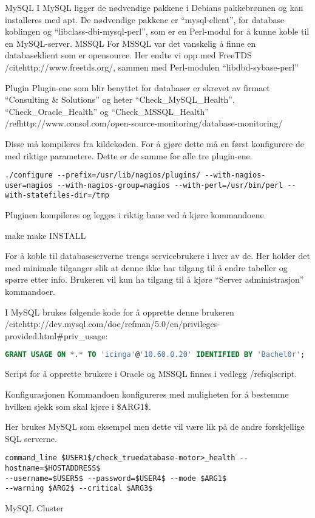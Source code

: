 MySQL
I MySQL ligger de nødvendige pakkene i Debians pakkebrønnen og kan installeres med apt. De nødvendige pakkene er “mysql-client”, for database koblingen og “libclass-dbi-mysql-perl”, som er en Perl-modul for å kunne koble til en MySQL-server. 
MSSQL
For MSSQL var det vanskelig å finne en databaseklient som er opensource. Her endte vi opp med FreeTDS /cite{http://www.freetds.org/}, sammen med Perl-modulen “libdbd-sybase-perl”

Plugin
Plugin-ene som blir benyttet for databaser er skrevet av firmaet “Consulting \& Solutions” og heter “Check\_MySQL\_Health”, “Check\_Oracle\_Health” og “Check\_MSSQL\_Health” /ref{http://www.consol.com/open-source-monitoring/database-monitoring/}

Disse må kompileres fra kildekoden. For å gjøre dette må en først konfigurere de med riktige parametere. Dette er de samme for alle tre plugin-ene.

\begin{lstlisting}
./configure --prefix=/usr/lib/nagios/plugins/ --with-nagios-user=nagios --with-nagios-group=nagios --with-perl=/usr/bin/perl --with-statefiles-dir=/tmp
\end{lstlisting}

Pluginen kompileres og legges i riktig bane ved å kjøre kommandoene

make
make INSTALL

For å koble til databaseserverne trengs servicebrukere i hver av de. Her holder det med minimale tilganger slik at denne ikke har tilgang til å endre tabeller og spørre etter info. Brukeren vil kun ha tilgang til å kjøre “Server administrasjon” kommandoer.

I MySQL brukes følgende kode for å opprette denne brukeren /cite{http://dev.mysql.com/doc/refman/5.0/en/privileges-provided.html#priv\_usage}:
\begin{lstlisting}[language=SQL]
GRANT USAGE ON *.* TO 'icinga'@'10.60.0.20' IDENTIFIED BY 'Bachel0r'; 
\end{lstlisting}

Script for å opprette brukere i Oracle og MSSQL finnes i vedlegg /ref{sqlscript}.

Konfigurasjonen
Kommandoen konfigureres med muligheten for å bestemme hvilken sjekk som skal kjøre i \$ARG1\$.

Her brukes MySQL som eksempel men dette vil være lik på de andre forskjellige SQL serverne. 
\begin{lstlisting}
command_line $USER1$/check_truedatabase-motor>_health --hostname=$HOSTADDRESS$     
--username=$USER5$ --password=$USER4$ --mode $ARG1$ 
--warning $ARG2$ --critical $ARG3$
\end{lstlisting}
MySQL Cluster

